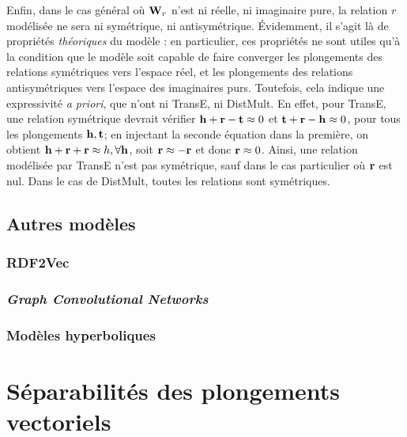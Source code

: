 Enfin, dans le cas général où $\bf{W}_r$ n'est ni réelle, ni imaginaire pure, la relation $r$ modélisée ne sera ni symétrique, ni antisymétrique. Évidemment, il s'agit là de propriétés \textit{théoriques} du modèle : en particulier, ces propriétés ne sont utiles qu'à la condition que le modèle soit capable de faire converger les plongements des relations symétriques vers l'espace réel, et les plongements des relations antisymétriques vers l'espace des imaginaires purs. Toutefois, cela indique une expressivité \textit{a priori}, que n'ont ni TransE, ni DistMult. En effet, pour TransE, une relation symétrique devrait vérifier $\bf{h + r - t} \approx 0$ et $\bf{t + r - h} \approx 0$, pour tous les plongements $\bf{h, t}$; en injectant la seconde équation dans la première, on obtient $\bf{h + r + r} \approx h, \forall \bf{h}$, soit $\bf{r \approx -r}$ et donc $\bf{r} \approx 0$. Ainsi,  une relation modélisée par TransE n'est pas symétrique, sauf dans le cas particulier où $\bf{r}$ est nul. Dans le cas de DistMult, toutes les relations sont symétriques.

\subsection{Autres modèles}
\label{subsec:kge-models-misc}

\subsubsection{RDF2Vec}
\subsubsection{\textit{Graph Convolutional Networks}}
\subsubsection{Modèles hyperboliques}


\section{Séparabilités des plongements vectoriels}
\label{sec:kge-sep}
